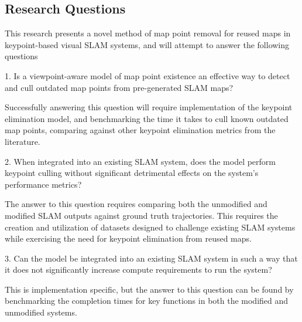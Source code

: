 \subsection{Research Questions}

This research presents a novel method of map point removal for reused maps in keypoint-based visual SLAM systems, and will attempt to answer the following questions


1. Is a viewpoint-aware model of map point existence an effective way to detect and cull outdated map points from pre-generated SLAM maps?

Successfully answering this question will require implementation of the keypoint elimination model, and benchmarking the time it takes to cull known outdated map points, comparing against other keypoint elimination metrics from the literature.


2. When integrated into an existing SLAM system, does the model perform keypoint culling without significant detrimental effects on the system's performance metrics?

The answer to this question requires comparing both the unmodified and modified SLAM outputs against ground truth trajectories. This requires the creation and utilization of datasets designed to challenge existing SLAM systems while exercising the need for keypoint elimination from reused maps.


3. Can the model be integrated into an existing SLAM system in such a way that it does not significantly increase compute requirements to run the system?

This is implementation specific, but the answer to this question can be found by benchmarking the completion times for key functions in both the modified and unmodified systems.